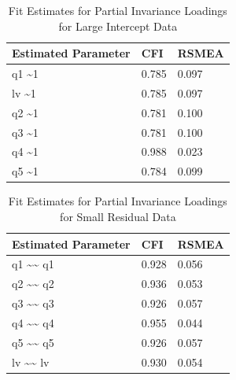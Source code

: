 \documentclass[
  man,floatsintext]{apa7}
\begin{document}
\begin{table}[tbp]

\begin{center}
\begin{threeparttable}

\caption{\label{tab:p-tab17}Fit Estimates for Partial Invariance Loadings for Large Intercept Data}

\begin{tabular}{lll}
\toprule
Estimated Parameter & CFI & RSMEA\\
\midrule
q1 \textasciitilde{}1 & 0.785 & 0.097\\
lv \textasciitilde{}1 & 0.785 & 0.097\\
q2 \textasciitilde{}1 & 0.781 & 0.100\\
q3 \textasciitilde{}1 & 0.781 & 0.100\\
q4 \textasciitilde{}1 & 0.988 & 0.023\\
q5 \textasciitilde{}1 & 0.784 & 0.099\\
\bottomrule
\end{tabular}

\end{threeparttable}
\end{center}

\end{table}

\begin{table}[tbp]

\begin{center}
\begin{threeparttable}

\caption{\label{tab:p-tab18}Fit Estimates for Partial Invariance Loadings for Small Residual Data}

\begin{tabular}{lll}
\toprule
Estimated Parameter & CFI & RSMEA\\
\midrule
q1 \textasciitilde{}\textasciitilde{} q1 & 0.928 & 0.056\\
q2 \textasciitilde{}\textasciitilde{} q2 & 0.936 & 0.053\\
q3 \textasciitilde{}\textasciitilde{} q3 & 0.926 & 0.057\\
q4 \textasciitilde{}\textasciitilde{} q4 & 0.955 & 0.044\\
q5 \textasciitilde{}\textasciitilde{} q5 & 0.926 & 0.057\\
lv \textasciitilde{}\textasciitilde{} lv & 0.930 & 0.054\\
\bottomrule
\end{tabular}

\end{threeparttable}
\end{center}

\end{table}
\end{document}

